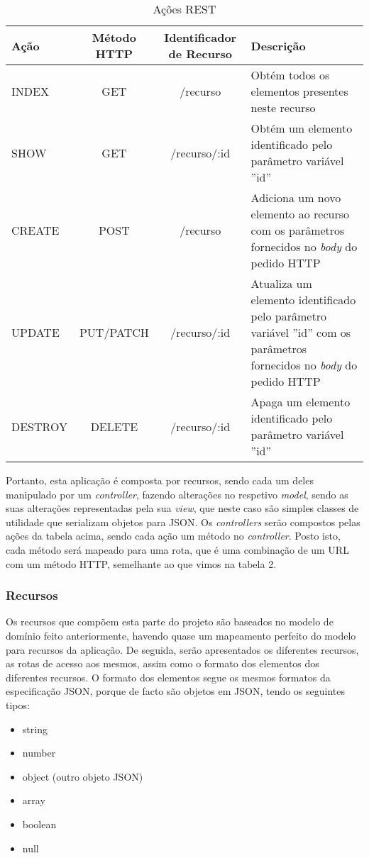 \begin{table}[H]
\centering
  \begin{tabularx}{\textwidth}{ | l | c | c | X | }
    \hline
    Ação & Método HTTP & Identificador de Recurso & Descrição\\  \hline
    INDEX & GET & /recurso & Obtém todos os elementos presentes neste recurso\\ \hline
    SHOW & GET & /recurso/:id & Obtém um elemento identificado pelo parâmetro variável ''id'' \\ \hline
    CREATE & POST & /recurso & Adiciona um novo elemento ao recurso com os parâmetros fornecidos no \textit{body} do pedido HTTP\\ \hline
    UPDATE & PUT/PATCH & /recurso/:id & Atualiza um elemento identificado pelo parâmetro variável ''id'' com os parâmetros fornecidos no \textit{body} do pedido HTTP \\ \hline
    DESTROY & DELETE & /recurso/:id & Apaga um elemento identificado pelo parâmetro variável ''id'' \\ \hline
  \end{tabularx}
  \caption{Ações REST}
\end{table}

Portanto, esta aplicação é composta por recursos, sendo cada um deles manipulado por um \textit{controller}, fazendo alterações no respetivo \textit{model}, sendo as suas alterações representadas pela sua \textit{view}, que neste caso são simples classes de utilidade que serializam objetos para JSON. Os \textit{controllers} serão compostos pelas ações da tabela acima, sendo cada ação um método no \textit{controller}. Posto isto, cada método será mapeado para uma rota, que é uma combinação de um URL com um método HTTP, semelhante ao que vimos na tabela 2.





\subsubsection{Recursos}

Os recursos que compõem esta parte do projeto são baseados no modelo de domínio feito anteriormente, havendo quase um mapeamento perfeito do modelo para recursos da aplicação. De seguida, serão apresentados os diferentes recursos, as rotas de acesso aos mesmos, assim como o formato dos elementos dos diferentes recursos. O formato dos elementos segue os mesmos formatos da especificação JSON, porque de facto são objetos em JSON, tendo os seguintes tipos:
\begin{itemize}
    \item string
    \item number
    \item object (outro objeto JSON)
    \item array
    \item boolean
    \item null
\end{itemize}

